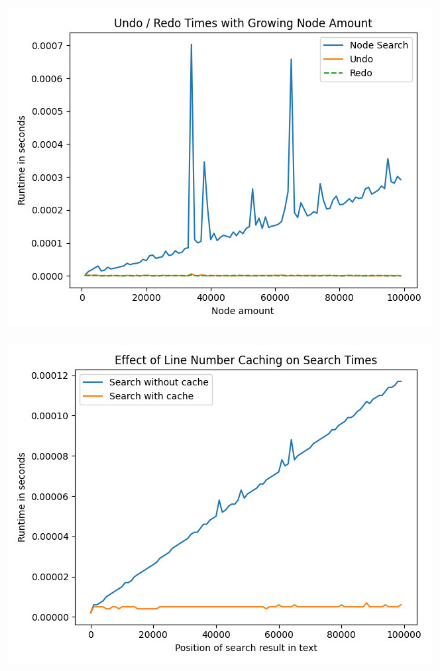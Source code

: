 \begin{minipage}[t]{0.48\textwidth}
\centering
\begin{figure}[H]
\centering
\caption{ }
\includegraphics[width=\textwidth]{./images/Profiler-Undo-Redo.jpg}
\label{fig:undoMetric}
\end{figure}
\end{minipage}
\hfill
\begin{minipage}[t]{0.48\textwidth}
\centering
\begin{figure}[H]
\centering
\caption{ }
\includegraphics[width=\textwidth]{./images/Profiler-Find-Caching.jpg}
\label{fig:findMetric}
\end{figure}
\end{minipage}


